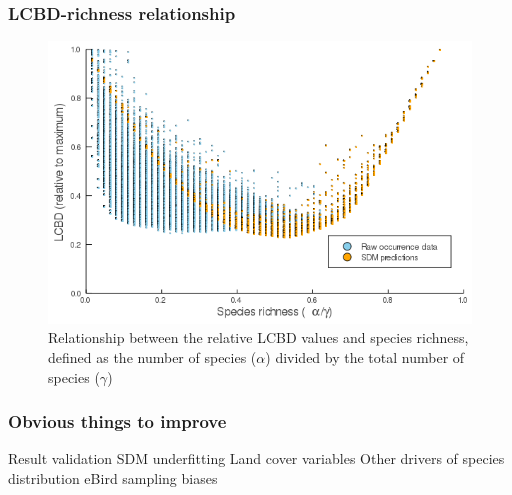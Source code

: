 \documentclass[10pt]{beamer}
\begin{document}
\begin{frame}
  \frametitle{LCBD-richness relationship}
  \begin{figure}
    \centering
    \includegraphics[scale=0.4]{fig/06_cmb_relation-oneplot.png}
    \caption{Relationship between the relative LCBD values and species richness, defined as the number of species ($\alpha$) divided by the total number of species ($\gamma$)}
  \end{figure}
\end{frame}

\begin{frame}
  \frametitle{Obvious things to improve}
  \vfill
  Result validation
  \vfill
  SDM underfitting
  \vfill
  Land cover variables
  \vfill
  Other drivers of species distribution
  \vfill
  eBird sampling biases
  \vfill
\end{frame}
\end{document}
